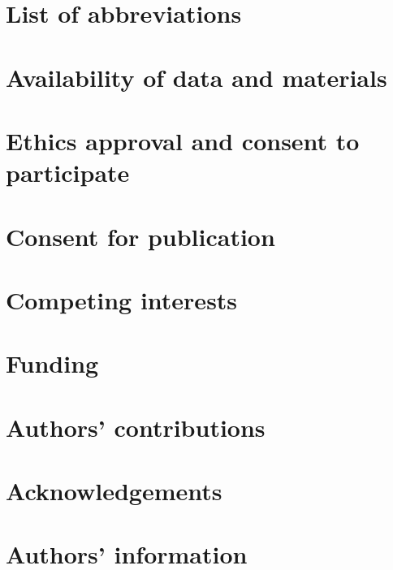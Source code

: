 \documentclass[sn-basic,Numbered]{sn-jnl}
\begin{document}

\maketitle







\section*{List of abbreviations}


\section*{Availability of data and materials}


\section*{Ethics approval and consent to participate}


\section*{Consent for publication}


\section*{Competing interests}


\section*{Funding}


\section*{Authors' contributions}


\section*{Acknowledgements}


\section*{Authors' information}




\appendix

\end{document}
